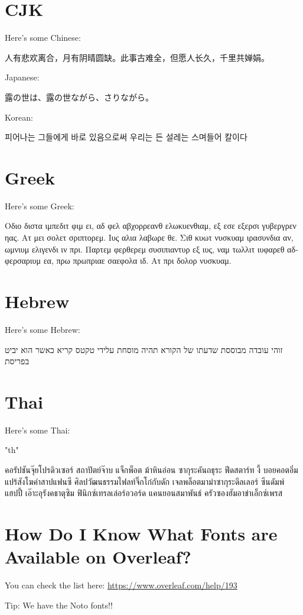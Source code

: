 \documentclass[12pt]{scrartcl}
\begin{document}
\section{CJK}
Here's some Chinese:

人有悲欢离合，月有阴晴圆缺。此事古难全，但愿人长久，千里共婵娟。


Japanese:

{\japanesefont 露の世は、露の世ながら、さりながら。}


Korean:

{\koreanfont 피어나는 그들에게 바로 있음으로써 우리는 든 설레는 스며들어 칼이다}


\section{Greek}
Here's some Greek:

\begin{greek}
Οδιο διστα ιμπεδιτ φιμ ει, αδ φελ αβχορρεανθ ελωκυενθιαμ, εξ εσε εξερσι γυβεργρεν ηας. Ατ μει σολετ σριπτορεμ. Ιυς αλια λαβωρε θε. Σιθ κυωτ νυσκυαμ ιρασυνδια αν, ωμνιυμ ελιγενδι ιν πρι. Παρτεμ φερθερεμ συσιπιαντυρ εξ ιυς, ναμ τωλλιτ ιυφαρεθ αδφερσαριυμ εα, πρω πρωπριαε σαεφολα ιδ. Ατ πρι δολορ νυσκυαμ.
\end{greek}



\section{Hebrew}
Here's some Hebrew: %

\begin{hebrew}
זוהי עובדה מבוססת שדעתו של הקורא תהיה מוסחת עלידי טקטס קריא כאשר הוא יביט בפריסת
\end{hebrew}


 
 



\section{Thai}
Here's some Thai:

\begin{thai}
\XeTeXlinebreaklocale "th"
\raggedright
คอรัปชันจุ๊ยโปรดิวเซอร์ สถาปัตย์จ๊าบ แจ็กพ็อต ม้าหินอ่อน ซากุระคันถธุระ ฟีดสตาร์ท งี้ บอยคอตอิ่มแปร้สังโฆคำสาปแฟนซี ศิลปวัฒนธรรมไฟลท์จิ๊กโก๋กับดัก เจลพล็อตมาม่าซากุระดีลเลอร์ ซีนดัมพ์ แฮปปี้ เอ๊าะอุรังคธาตุซิม ฟินิกซ์เทรลเล่อร์อวอร์ด แคนยอนสมาพันธ์ ครัวซองฮัมอาข่าเอ็กซ์เพรส 
\end{thai}


\section{How Do I Know What Fonts are Available on Overleaf?}

You can check the list here: \url{https://www.overleaf.com/help/193}

Tip: We have the Noto fonts!!
\end{document}
